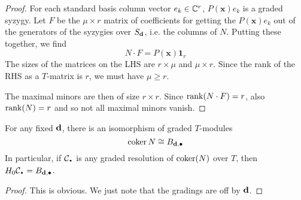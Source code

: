 \documentclass[fleqn,reqno]{amsart}
\numberwithin{first}{chapter}
\begin{document}
\begin{proof}
For each standard basis column vector $e_k\in\mathbb{C}^r$, $P(\mathbf x)e_k$ is a graded syzygy.
Let $F$ be the $\mu\times r$ matrix of coefficients for getting the $P(\mathbf x)e_k$
out of the generators of the syzygies over $S_\mathbf d$, i.e. the columns of $N$.
Putting these together, we find
\[
	N\cdot F=P(\mathbf x)\mathbf 1_r
\]
The sizes of the matrices on the LHS are $r\times\mu$ and $\mu\times r$.
Since the rank of the RHS as a $T$-matrix is $r$, we must have $\mu\geq r$.

The maximal minors are then of size $r\times r$. Since $\operatorname{rank}(N\cdot F)=r$,
also $\operatorname{rank}(N)=r$ and so not all maximal minors vanish.
\end{proof}

\begin{lemma}
\label{lemma:cokerN}	    
For any fixed $\mathbf d$, there is an isomorphism of graded $T$-modules
\[
\operatorname{coker} N\cong B_{\mathbf d,\bullet}
\]
In particular, if $\mathcal{C}_\nbul$ is any graded resolution of $\operatorname{coker}(N)$ over $T$,
then $H_0\mathcal{C}_\nbul=B_{\d,\bullet}$.
\end{lemma}

\begin{proof}
	This is obvious. We just note that the gradings are off by $\mathbf d$.
\end{proof}
\end{document}
